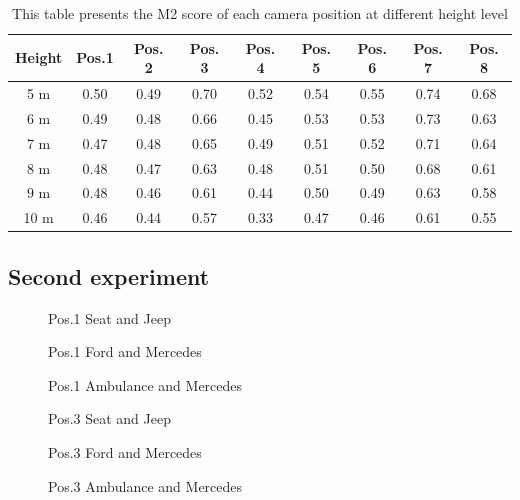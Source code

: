 \begin{table}[!h]
\caption{This table presents the M2 score of each camera position at different height level \label{tab:height_experiment}}
\centering
    \begin{tabular}{ | c | c | c | c | c | c | c | c | c |}
    \hline
    Height & Pos.1 & Pos. 2 & Pos. 3 & Pos. 4 & Pos. 5 & Pos. 6 & Pos. 7 & Pos. 8 \\ \hline
    5 m & 0.50 & 0.49 & 0.70 & 0.52 & 0.54 & 0.55 & 0.74 & 0.68\\ \hline
    6 m & 0.49 & 0.48 & 0.66 & 0.45 & 0.53 & 0.53 & 0.73 & 0.63\\ \hline
    7 m & 0.47 & 0.48 & 0.65 & 0.49 & 0.51 & 0.52 & 0.71 & 0.64\\ \hline
    8 m & 0.48 & 0.47 & 0.63 & 0.48 & 0.51 & 0.50 & 0.68 & 0.61\\ \hline
    9 m & 0.48 & 0.46 & 0.61 & 0.44 & 0.50 & 0.49 & 0.63 & 0.58\\ \hline
    10 m & 0.46 & 0.44 & 0.57 & 0.33 & 0.47 & 0.46 & 0.61 & 0.55\\ \hline
    \end{tabular}
\end{table}

\newpage
\subsection{Second experiment}

\begin{figure}[!htb]
  
  \caption{Pos.1 Seat and Jeep}\label{fig:pos1_8m}
\endminipage\hfill
{}
  
  \caption{Pos.1 Ford and Mercedes}\label{fig:pos1_ford_merc}
\endminipage\hfill
\end{figure}

\newpage
\begin{figure}[!htb]
  
  \caption{Pos.1 Ambulance and Mercedes}\label{fig:pos1_amb_merc}
\endminipage\hfill
{}
  
  \caption{Pos.3 Seat and Jeep}\label{fig:pos3_8m}
\endminipage\hfill
\end{figure}

\begin{figure}[!htb]
  
  \caption{Pos.3 Ford and Mercedes}\label{fig:pos3_ford_merc}
\endminipage\hfill
{}
  
  \caption{Pos.3 Ambulance and Mercedes}\label{fig:pos3_amb_merc}
\endminipage\hfill
\end{figure}

